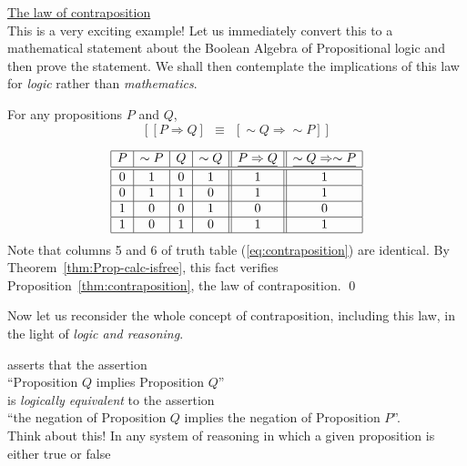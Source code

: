 \bigskip

\noindent 
\underline{\small\sf The law of contraposition} \\
This is a very exciting example!  Let us immediately convert this to a
mathematical statement about the Boolean Algebra of Propositional
logic and then prove the statement.  We shall then contemplate the
implications of this law for {\em logic} rather than {\em mathematics}.

\begin{prop}
\label{thm:contraposition}
For any propositions $P$ and $Q$,
\[  \left[ [ P \Rightarrow Q ] \ \ \equiv \ \ [ \sim Q
    \Rightarrow \sim P ] \right]
\]
\end{prop}

\begin{equation}
\label{eq:contraposition}
\begin{array}{|c|c|c|c||c||c|}
\hline
P & \sim P & Q & \sim Q & \underline{P \Rightarrow Q}
 & \underline{\sim Q \Rightarrow \sim P} \\
\hline
\hline
0 & 1 & 0 & 1 & 1 & 1 \\
\hline
0 & 1 & 1 & 0 & 1 & 1 \\
\hline
1 & 0 & 0 & 1 & 0 & 0 \\
\hline
1 & 0 & 1 & 0 & 1 & 1 \\
\hline
\end{array}
\end{equation}
Note that columns 5 and 6 of truth table (\ref{eq:contraposition}) are
identical.  By Theorem~\ref{thm:Prop-calc-isfree}, this fact verifies
Proposition~\ref{thm:contraposition}, the law of contraposition.
\qed

\smallskip

Now let us reconsider the whole concept of contraposition, including
this law, in the light of {\em logic and reasoning}.

 asserts that the assertion \\
\hspace*{.35in}
``Proposition $Q$ implies Proposition $Q$'' \\
is {\em logically equivalent} to the assertion \\
\hspace*{.35in}
``the negation of Proposition $Q$ implies the negation of Proposition
$P$''.  \\
Think about this!  In any system of reasoning in which a given
proposition is either {\sc true} or {\sc false} 





